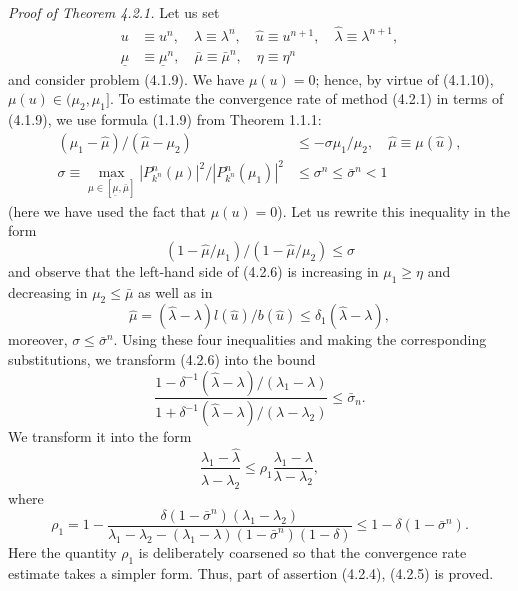 \documentclass[11pt,oneside]{book}
\begin{document}
\textit{Proof of Theorem 4.2.1.} Let us set
\[
\begin{aligned}
u &\equiv u^n, \quad \lambda \equiv \lambda^n, \quad \hat{u} \equiv u^{n+1}, \quad \hat{\lambda} \equiv \lambda^{n+1}, \\
\underline{\mu} &\equiv \underline{\mu}^n, \quad \bar{\mu} \equiv \bar{\mu}^n, \quad \eta \equiv \eta^n
\end{aligned}
\]
and consider problem (4.1.9). We have $\mu(u) = 0$; hence, by virtue of (4.1.10), $\mu(u) \in (\mu_2, \mu_1]$. To estimate the convergence rate of method (4.2.1) in terms of (4.1.9), we use formula (1.1.9) from Theorem 1.1.1:
\[
\begin{aligned}
(\mu_1 - \hat{\mu}) / (\hat{\mu} - \mu_2) &\leqslant - \sigma \mu_1 / \mu_2, \quad \hat{\mu} \equiv \mu(\hat{u}), \\
\sigma \equiv \max_{\mu \in [\underline{\mu}, \bar{\mu}]} |P_{k^n}^n(\mu)|^2 / |P_{k^n}^n(\mu_1)|^2 &\leqslant \sigma^n \leqslant \bar{\sigma}^n < 1 %
\end{aligned}
\]
(here we have used the fact that $\mu(u) = 0$). Let us rewrite this inequality in the form
\[
(1 - \hat{\mu} / \mu_1) / (1 - \hat{\mu} / \mu_2) \leqslant \sigma \tag{4.2.6}
\]
and observe that the left-hand side of (4.2.6) is increasing in $\mu_1 \geqslant \eta$ and decreasing in $\mu_2 \leqslant \bar{\mu}$ as well as in
\[
\hat{\mu} = (\hat{\lambda} - \lambda) l(\hat{u}) / b(\hat{u}) \leqslant \delta_1 (\hat{\lambda} - \lambda),
\]
moreover, $\sigma \leqslant \bar{\sigma}^n$. Using these four inequalities and making the corresponding substitutions, we transform (4.2.6) into the bound
\[
\frac{1 - \delta^{-1} (\hat{\lambda} - \lambda) / (\lambda_1 - \lambda)}{1 + \delta^{-1} (\hat{\lambda} - \lambda) / (\lambda - \lambda_2)} \leqslant \bar{\sigma}_n. %
\]
We transform it into the form
\[
\frac{\lambda_1 - \hat{\lambda}}{\hat{\lambda} - \lambda_2} \leqslant \rho_1 \frac{\lambda_1 - \lambda}{\lambda - \lambda_2}, \tag{4.2.7}
\]
where
\[
\rho_1 = 1 - \frac{\delta (1 - \bar{\sigma}^n)(\lambda_1 - \lambda_2)}{\lambda_1 - \lambda_2 - (\lambda_1 - \lambda)(1 - \bar{\sigma}^n)(1 - \delta)} \leqslant 1 - \delta (1 - \bar{\sigma}^n).
\]
Here the quantity $\rho_1$ is deliberately coarsened so that the convergence rate estimate takes a simpler form. Thus, part of assertion (4.2.4), (4.2.5) is proved.
\end{document}
